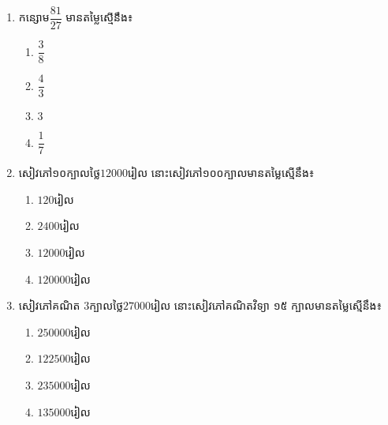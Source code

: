 \begin{enumerate}
\item កន្សោម$\dfrac{81}{27}$ មានតម្លៃស្មើនឹង៖
\begin{multicols}{4}
\begin{enumerate}[label=\alph*.]
\item $\dfrac{3}{8}$
\item $\dfrac{4}{3}$
\item $3$
\item $\dfrac{1}{7}$
\end{enumerate}
\end{multicols}

\item សៀវភៅ១០ក្បាលថ្លៃ$12000$រៀល នោះសៀវភៅ១០០ក្បាលមានតម្លៃស្មើនឹង៖
\begin{multicols}{4}
\begin{enumerate}[label=\alph*.]
\item $120$រៀល
\item $2400$រៀល
\item $12000$រៀល
\item $120000$រៀល
\end{enumerate}
\end{multicols}

\item សៀវភៅគណិត $3$ក្បាលថ្លៃ$27000$រៀល នោះសៀវភៅគណិតវិទ្យា ១៥ ក្បាលមានតម្លៃស្មើនឹង៖
\begin{multicols}{4}
\begin{enumerate}[label=\alph*.]
\item $250000$រៀល
\item $122500$រៀល
\item $235000$រៀល
\item $135000$រៀល
\end{enumerate}
\end{multicols}


\end{enumerate}


\newpage 
\problem

